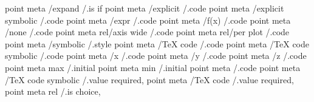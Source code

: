 point meta    /expand            /.is if
point meta    /explicit          /.code
point meta    /explicit symbolic /.code
point meta    /expr              /.code
point meta    /f(x)              /.code
point meta    /none              /.code
point meta rel/axis wide         /.code
point meta rel/per plot          /.code
point meta    /symbolic          /.style
point meta    /TeX code          /.code
point meta    /TeX code symbolic /.code
point meta    /x                 /.code
point meta    /y                 /.code
point meta    /z                 /.code
point meta max                   /.initial         
point meta min                   /.initial         
point meta                       /.code            
point meta    /TeX code symbolic /.value required,
point meta    /TeX code          /.value required,
point meta rel                   /.is choice,      
